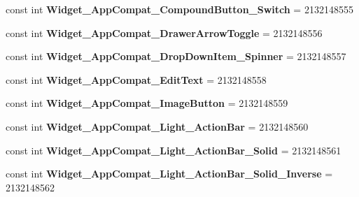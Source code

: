 \begin{DoxyCompactItemize}
\item 
\mbox{\label{classst_delivery_1_1_resource_1_1_style_a374966c723d08e8b14fa886d55cda0fb}} 
const int {\bfseries Widget\+\_\+\+App\+Compat\+\_\+\+Compound\+Button\+\_\+\+Switch} = 2132148555
\item 
\mbox{\label{classst_delivery_1_1_resource_1_1_style_a7f6fd1eec2818dcf6ed50e630d257d86}} 
const int {\bfseries Widget\+\_\+\+App\+Compat\+\_\+\+Drawer\+Arrow\+Toggle} = 2132148556
\item 
\mbox{\label{classst_delivery_1_1_resource_1_1_style_a1ca94b9bd023525ad629c1089e0ac26e}} 
const int {\bfseries Widget\+\_\+\+App\+Compat\+\_\+\+Drop\+Down\+Item\+\_\+\+Spinner} = 2132148557
\item 
\mbox{\label{classst_delivery_1_1_resource_1_1_style_a485619c83363cf4cb50ff088fde90ad3}} 
const int {\bfseries Widget\+\_\+\+App\+Compat\+\_\+\+Edit\+Text} = 2132148558
\item 
\mbox{\label{classst_delivery_1_1_resource_1_1_style_a1f1d31a74a07a459f16abd69e58fb6fb}} 
const int {\bfseries Widget\+\_\+\+App\+Compat\+\_\+\+Image\+Button} = 2132148559
\item 
\mbox{\label{classst_delivery_1_1_resource_1_1_style_a3753f71ed7856950685b8ebc7a875b02}} 
const int {\bfseries Widget\+\_\+\+App\+Compat\+\_\+\+Light\+\_\+\+Action\+Bar} = 2132148560
\item 
\mbox{\label{classst_delivery_1_1_resource_1_1_style_a6fce41594b9f40caa53519f056d46519}} 
const int {\bfseries Widget\+\_\+\+App\+Compat\+\_\+\+Light\+\_\+\+Action\+Bar\+\_\+\+Solid} = 2132148561
\item 
\mbox{\label{classst_delivery_1_1_resource_1_1_style_ad73aca282e4215c407596fa8d2c2d52f}} 
const int {\bfseries Widget\+\_\+\+App\+Compat\+\_\+\+Light\+\_\+\+Action\+Bar\+\_\+\+Solid\+\_\+\+Inverse} = 2132148562
\item 

\end{DoxyCompactItemize}
